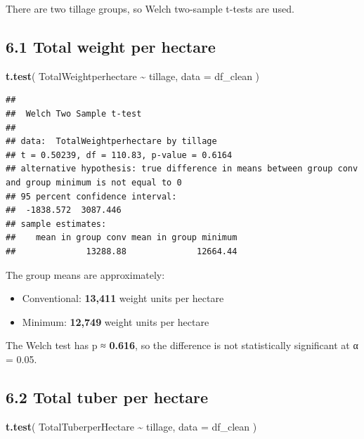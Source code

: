\documentclass[
]{article}
\newenvironment{Shaded}{\begin{snugshade}}{\end{snugshade}}
\newcommand{\AttributeTok}[1]{\textcolor[rgb]{0.13,0.29,0.53}{#1}}
\newcommand{\FunctionTok}[1]{\textcolor[rgb]{0.13,0.29,0.53}{\textbf{#1}}}
\newcommand{\NormalTok}[1]{#1}
\newcommand{\SpecialCharTok}[1]{\textcolor[rgb]{0.81,0.36,0.00}{\textbf{#1}}}
\providecommand{\tightlist}{%
  \setlength{\itemsep}{0pt}\setlength{\parskip}{0pt}}
\begin{document}
There are two tillage groups, so Welch two-sample t-tests are used.

\subsection{6.1 Total weight per
hectare}\label{total-weight-per-hectare-1}

\begin{Shaded}
\begin{Highlighting}[]
\FunctionTok{t.test}\NormalTok{(}
\NormalTok{  TotalWeightperhectare }\SpecialCharTok{\textasciitilde{}}\NormalTok{ tillage,}
  \AttributeTok{data =}\NormalTok{ df\_clean}
\NormalTok{)}
\end{Highlighting}
\end{Shaded}

\begin{verbatim}
## 
##  Welch Two Sample t-test
## 
## data:  TotalWeightperhectare by tillage
## t = 0.50239, df = 110.83, p-value = 0.6164
## alternative hypothesis: true difference in means between group conv and group minimum is not equal to 0
## 95 percent confidence interval:
##  -1838.572  3087.446
## sample estimates:
##    mean in group conv mean in group minimum 
##              13288.88              12664.44
\end{verbatim}

The group means are approximately:

\begin{itemize}
\tightlist
\item
  Conventional: \textbf{13,411} weight units per hectare
\item
  Minimum: \textbf{12,749} weight units per hectare
\end{itemize}

The Welch test has p ≈ \textbf{0.616}, so the difference is not
statistically significant at α = 0.05.

\subsection{6.2 Total tuber per
hectare}\label{total-tuber-per-hectare-1}

\begin{Shaded}
\begin{Highlighting}[]
\FunctionTok{t.test}\NormalTok{(}
\NormalTok{  TotalTuberperHectare }\SpecialCharTok{\textasciitilde{}}\NormalTok{ tillage,}
  \AttributeTok{data =}\NormalTok{ df\_clean}
\NormalTok{)}
\end{Highlighting}
\end{Shaded}
\end{document}
